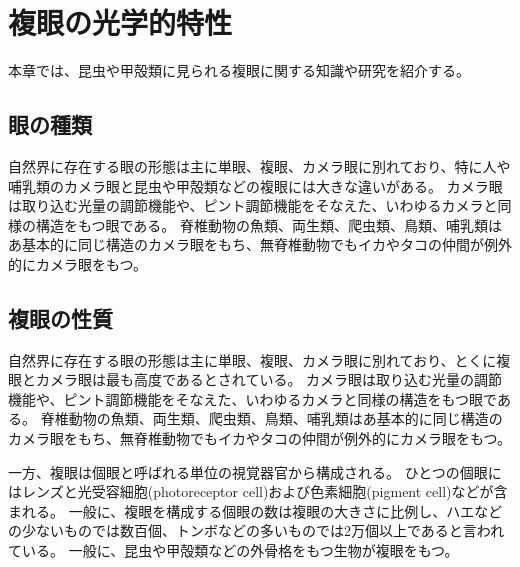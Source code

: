 \chapter{複眼の光学的特性}
\label{CKnowledge}

本章では、昆虫や甲殻類に見られる複眼に関する知識や研究を紹介する。

\section{眼の種類}

自然界に存在する眼の形態は主に単眼、複眼、カメラ眼に別れており、特に人や哺乳類のカメラ眼と昆虫や甲殻類などの複眼には大きな違いがある。
カメラ眼は取り込む光量の調節機能や、ピント調節機能をそなえた、いわゆるカメラと同様の構造をもつ眼である\cite{newton-2012-6}。
脊椎動物の魚類、両生類、爬虫類、鳥類、哺乳類はあ基本的に同じ構造のカメラ眼をもち、無脊椎動物でもイカやタコの仲間が例外的にカメラ眼をもつ\cite{newton-2012-6}。



\section{複眼の性質}

自然界に存在する眼の形態は主に単眼、複眼、カメラ眼に別れており、とくに複眼とカメラ眼は最も高度であるとされている\cite{newton-2012-6}。
カメラ眼は取り込む光量の調節機能や、ピント調節機能をそなえた、いわゆるカメラと同様の構造をもつ眼である\cite{newton-2012-6}。
脊椎動物の魚類、両生類、爬虫類、鳥類、哺乳類はあ基本的に同じ構造のカメラ眼をもち、無脊椎動物でもイカやタコの仲間が例外的にカメラ眼をもつ\cite{newton-2012-6}。

一方、複眼は個眼と呼ばれる単位の視覚器官から構成される。
ひとつの個眼にはレンズと光受容細胞(photoreceptor cell)および色素細胞(pigment cell)などが含まれる。
一般に、複眼を構成する個眼の数は複眼の大きさに比例し、ハエなどの少ないものでは数百個、トンボなどの多いものでは2万個以上であると言われている\cite{arikawa-zougan}。
一般に、昆虫や甲殻類などの外骨格をもつ生物が複眼をもつ。

